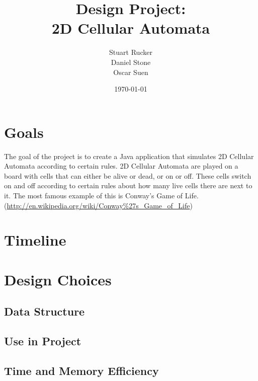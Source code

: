 \documentclass[12pt]{article}
\title{Design Project: \\ 2D Cellular Automata}
\author{Stuart Rucker \\ Daniel Stone \\ Oscar Suen}
\date{\today}
\begin{document}
\maketitle

\section{Goals}
The goal of the project is to create a Java application that simulates 2D Cellular Automata according to certain rules.  2D Cellular Automata are played on a board with cells that can either be alive or dead, or on or off.  These cells switch on and off according to certain rules about how many live cells there are next to it.  The most famous example of this is Conway's Game of Life.  (\url{http://en.wikipedia.org/wiki/Conway\%27s_Game_of_Life})

\section{Timeline}
\section{Design Choices}
\subsection{Data Structure}
\subsection{Use in Project}
\subsection{Time and Memory Efficiency}
\end{document}
